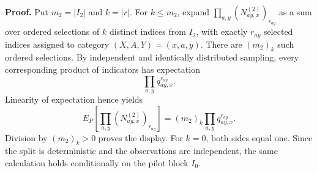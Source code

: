 \textbf{Proof.}
Put \(m_2=\lvert I_2\rvert\) and \(k=\lvert r\rvert\).  For \(k\le m_2\), expand
\(\prod_{a,y}(N^{(2)}_{ay,x})_{r_{ay}}\) as a sum over ordered selections of \(k\) distinct indices from \(I_2\), with exactly \(r_{ay}\) selected indices assigned to category \((X,A,Y)=(x,a,y)\).  There are \((m_2)_k\) such ordered selections.  By independent and identically distributed sampling, every corresponding product of indicators has expectation
\[
 \prod_{a,y}q_{ay,x}^{r_{ay}}.
\]
Linearity of expectation hence yields
\[
 E_P\!\left[\prod_{a,y}(N^{(2)}_{ay,x})_{r_{ay}}\right]
 =(m_2)_k\prod_{a,y}q_{ay,x}^{r_{ay}}.
\]
Division by \((m_2)_k>0\) proves the display.  For \(k=0\), both sides equal one.  Since the split is deterministic and the observations are independent, the same calculation holds conditionally on the pilot block \(I_0\).